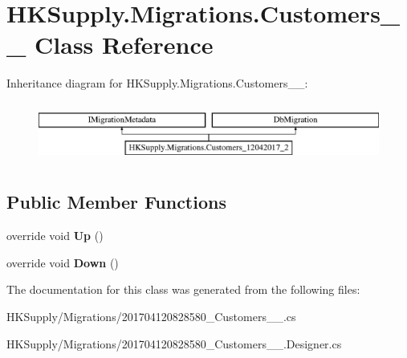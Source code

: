 \hypertarget{class_h_k_supply_1_1_migrations_1_1_customers__12042017__2}{}\section{H\+K\+Supply.\+Migrations.\+Customers\+\_\+\_ Class Reference}
\label{class_h_k_supply_1_1_migrations_1_1_customers__12042017__2}
Inheritance diagram for H\+K\+Supply.\+Migrations.\+Customers\+\_\+\_\+:\begin{figure}[H]
\begin{center}
\leavevmode
\includegraphics[height=2.000000cm]{class_h_k_supply_1_1_migrations_1_1_customers__12042017__2}
\end{center}
\end{figure}
\subsection*{Public Member Functions}
\begin{DoxyCompactItemize}
\item 
\mbox{\label{class_h_k_supply_1_1_migrations_1_1_customers__12042017__2_a7280b0419e95995ffcab9e9b17e9af67}} 
override void {\bfseries Up} ()
\item 
\mbox{\label{class_h_k_supply_1_1_migrations_1_1_customers__12042017__2_ad8daf689c74447e48168e2180d7df469}} 
override void {\bfseries Down} ()
\end{DoxyCompactItemize}


The documentation for this class was generated from the following files\+:\begin{DoxyCompactItemize}
\item 
H\+K\+Supply/\+Migrations/201704120828580\+\_\+\+Customers\+\_\+\_.\+cs\item 
H\+K\+Supply/\+Migrations/201704120828580\+\_\+\+Customers\+\_\+\_.\+Designer.\+cs\end{DoxyCompactItemize}
